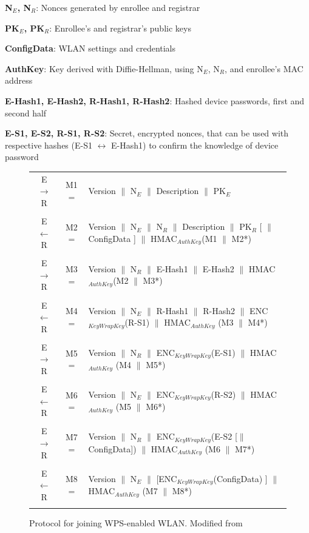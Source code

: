 \documentclass[12pt,a4paper,oneside,pdftex]{report}
\begin{document}
\textbf{N$_E$, N$_R$}: Nonces generated by enrollee and registrar

\textbf{PK$_E$, PK$_R$}: Enrollee's and registrar's public keys

\textbf{ConfigData}: WLAN settings and credentials

\textbf{AuthKey}: Key derived with Diffie-Hellman, using N$_E$, N$_R$, and enrollee's MAC address

\textbf{E-Hash1, E-Hash2, R-Hash1, R-Hash2}: Hashed device passwords, first and second half

\textbf{E-S1, E-S2, R-S1, R-S2}: Secret, encrypted nonces, that can be used with respective hashes (E-S1 $\leftrightarrow$ E-Hash1) to confirm the knowledge of device password

\begin{figure}
\label{tab:wps_full}
\begin{tabular}{c|c p{10cm}}

E $\rightarrow$ R & M1 = & Version $\|$ N$_E$ $\|$ Description $\|$ PK$_E$ 
\\\\

E $\leftarrow$  R & M2 = & Version $\|$ N$_E$ $\|$ N$_R$ $\|$ Description $\|$ PK$_R$ [ $\|$ ConfigData ] $\|$ HMAC$_{AuthKey}$(M1 $\|$ M2*) 
\\\\

E $\rightarrow$ R & M3 = & Version $\|$ N$_R$ $\|$ E-Hash1 $\|$ E-Hash2 $\|$ HMAC$_{AuthKey}$(M2 $\|$ M3*) 
\\\\

E $\leftarrow$  R & M4 = & Version $\|$ N$_E$ $\|$ R-Hash1 $\|$ R-Hash2 $\|$ ENC$_{KeyWrapKey}$(R-S1) $\|$ HMAC$_{AuthKey}$ (M3 $\|$ M4*) 
\\\\

E $\rightarrow$ R & M5 = & Version $\|$ N$_R$ $\|$ ENC$_{KeyWrapKey}$(E-S1) $\|$ HMAC$_{AuthKey}$ (M4 $\|$ M5*) 
\\\\

E $\leftarrow$  R & M6 = & Version $\|$ N$_E$ $\|$ ENC$_{KeyWrapKey}$(R-S2) $\|$ HMAC$_{AuthKey}$ (M5 $\|$ M6*) 
\\\\

E $\rightarrow$ R & M7 = & Version $\|$ N$_R$ $\|$ ENC$_{KeyWrapKey}$(E-S2 [$\|$ConfigData]) $\|$ HMAC$_{AuthKey}$ (M6 $\|$ M7*) 
\\\\

E $\leftarrow$  R & M8 = & Version $\|$ N$_E$ $\|$ [ENC$_{KeyWrapKey}$(ConfigData) ] $\|$ HMAC$_{AuthKey}$ (M7 $\|$ M8*) 
\\\\

\end{tabular}
\caption{Protocol for joining WPS-enabled WLAN. Modified from~\cite{microsoftWCN}}
\end{figure}
\end{document}
